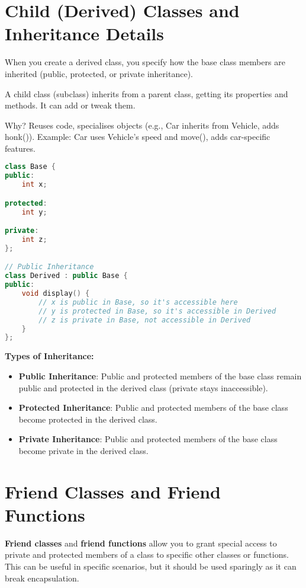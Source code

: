 \documentclass[a4paper,12pt]{article}
\begin{document}
\section{Child (Derived) Classes and Inheritance Details}
When you create a derived class, you specify how the base class members are inherited (public, protected, or private inheritance).

A child class (subclass) inherits from a parent class, getting its properties and methods. It can add or tweak them.

Why? Reuses code, specialises objects (e.g., Car inherits from Vehicle, adds honk()).
Example: Car uses Vehicle’s speed and move(), adds car-specific features.

\begin{lstlisting}[language=C++]
class Base {
public:
    int x;

protected:
    int y;

private:
    int z;
};

// Public Inheritance
class Derived : public Base {
public:
    void display() {
        // x is public in Base, so it's accessible here
        // y is protected in Base, so it's accessible in Derived
        // z is private in Base, not accessible in Derived
    }
};
\end{lstlisting}

\textbf{Types of Inheritance:}
\begin{itemize}
    \item \textbf{Public Inheritance}: Public and protected members of the base class remain public and protected in the derived class (private stays inaccessible).
    \item \textbf{Protected Inheritance}: Public and protected members of the base class become protected in the derived class.
    \item \textbf{Private Inheritance}: Public and protected members of the base class become private in the derived class.
\end{itemize}

\section{Friend Classes and Friend Functions}
\textbf{Friend classes} and \textbf{friend functions} allow you to grant special access to private and protected members of a class to specific other classes or functions. This can be useful in specific scenarios, but it should be used sparingly as it can break encapsulation.
\end{document}
